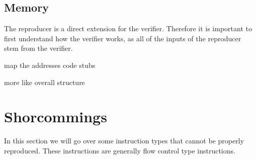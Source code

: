 \subsection{Memory}

The reproducer is a direct extension for the verifier.
Therefore it is important to first understand how the verifier works, as all of the inputs of the reproducer stem from the verifier.

map the addresses code stubs

more like overall structure

\section{Shorcommings}
In this section we will go over some instruction types that cannot be properly reproduced.
These instructions are generally flow control type instructions.